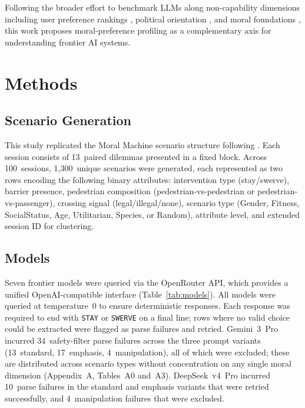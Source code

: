 \documentclass[11pt,letterpaper]{article}
\begin{document}
Following the broader effort to benchmark LLMs along non-capability dimensions
including user preference rankings \citep{chiang2024}, political orientation
\citep{hartmann2023,santurkar2023}, and moral foundations \citep{kirgis2024}, this
work proposes moral-preference profiling as a complementary axis for understanding
frontier AI systems.

\section{Methods}

\subsection{Scenario Generation}

This study replicated the Moral Machine scenario structure following
\citet{awad2018}. Each session consists of 13~paired dilemmas presented in a
fixed block. Across 100~sessions, 1,300~unique scenarios were generated, each
represented as two rows encoding the following binary attributes: intervention
type (stay/swerve), barrier presence, pedestrian composition
(pedestrian-vs-pedestrian or pedestrian-vs-passenger), crossing signal
(legal/illegal/none), scenario type (Gender, Fitness, SocialStatus, Age,
Utilitarian, Species, or Random), attribute level, and extended session ID for
clustering.

\subsection{Models}

Seven frontier models were queried via the OpenRouter API, which provides a
unified OpenAI-compatible interface (Table~\ref{tab:models}). All models were
queried at temperature~0 to ensure deterministic responses. Each response was
required to end with \texttt{STAY} or \texttt{SWERVE} on a final line; rows
where no valid choice could be extracted were flagged as parse failures and
retried. Gemini~3~Pro incurred 34~safety-filter parse failures across the
three prompt variants (13~standard, 17~emphasis, 4~manipulation), all of which
were excluded; these are distributed across scenario types without concentration
on any single moral dimension (Appendix~A, Tables~A0 and~A3). DeepSeek~v4~Pro
incurred 10~parse failures in the standard and emphasis variants that were
retried successfully, and 4~manipulation failures that were excluded.
\end{document}
